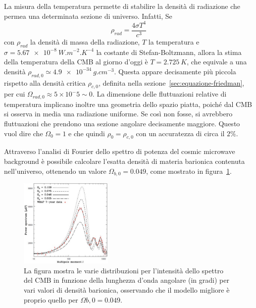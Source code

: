 La misura della temperatura permette di stabilire la densità di radiazione che permea una determinata sezione di universo. Infatti, Se
\[
    \rho_{rad} = \frac{4\sigma T^4}{c^3}
\]
con $\rho_{rad}$ la densità di massa della radiazione, $T$ la temperatura e $\sigma = \SI{5.67e-8}{W.m^{-2}.K^{-4}}$ la costante di Stefan-Boltzmann, allora la stima della temperatura della CMB al giorno d'oggi è $T=\SI{2.725}{K}$, che equivale a una densità $\rho_{rad, 0} \simeq \SI{4.9e-34}{g.cm^{-3}}$. Questa appare decisamente più piccola rispetto alla densità critica $\rho_{c,0}$, definita nella sezione~\ref{sec:equazione-friedman}, per cui $\Omega_{rad,0} \approx 5\times 10^-5 \sim 0$. La dimensione delle fluttuazioni relative di temperatura implicano inoltre una geometria dello spazio piatta, poiché dal CMB si osserva in media una radiazione uniforme. Se così non fosse, si avrebbero fluttuazioni che prendono una sezione angolare decisamente maggiore. Questo vuol dire che $\Omega_0 = 1$ e che quindi $\rho_0 = \rho_{c,0}$ con un accuratezza di circa il $2\%$.

Attraverso l'analisi di Fourier dello spettro di potenza del cosmic microwave background è possibile calcolare l'esatta densità di materia barionica contenuta nell'universo, ottenendo un valore $\Omega_{b,0} = 0.049$, come mostrato in figura~\ref{fig:baryon}.
\begin{figure}
    \centering
    \includegraphics[width=0.4\textwidth]{immagini/barioni.png}
    \caption{La figura mostra le varie distribuzioni per l'intensità dello spettro del CMB in funzione della lunghezza d'onda angolare (in gradi) per vari valori di densità barionica, osservando che il modello migliore è proprio quello per $\Omega{b,0} = 0.049$.}\label{fig:baryon}
\end{figure}

